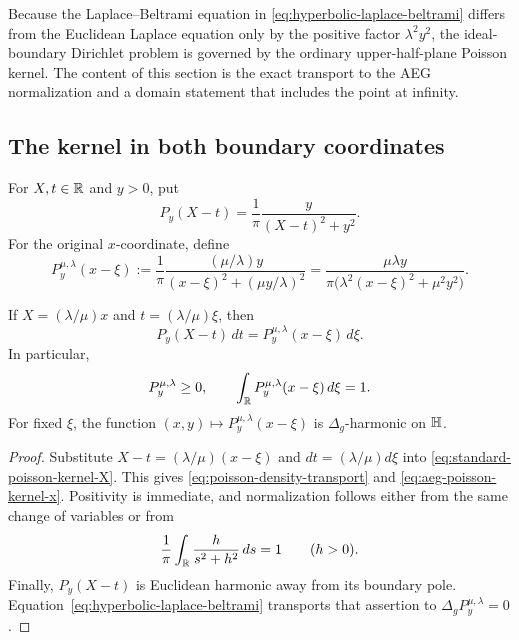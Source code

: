 Because the Laplace--Beltrami equation in
\eqref{eq:hyperbolic-laplace-beltrami} differs from the Euclidean Laplace
equation only by the positive factor $\lambda^2y^2$, the ideal-boundary
Dirichlet problem is governed by the ordinary upper-half-plane Poisson kernel.
The content of this section is the exact transport to the AEG normalization
and a domain statement that includes the point at infinity.

\subsection{The kernel in both boundary coordinates}

For $X,t\in\mathbb{R}$ and $y>0$, put
\begin{equation}\label{eq:standard-poisson-kernel-X}
 P_y(X-t)=\frac1\pi\frac{y}{(X-t)^2+y^2}.
\end{equation}
For the original $x$-coordinate, define
\begin{equation}\label{eq:aeg-poisson-kernel-x}
 P^{\mu,\lambda}_y(x-\xi)
 :=\frac1\pi
   \frac{(\mu/\lambda)y}
        {(x-\xi)^2+(\mu y/\lambda)^2}
 =\frac{\mu\lambda y}
        {\pi\bigl(\lambda^2(x-\xi)^2+\mu^2y^2\bigr)}.
\end{equation}

\begin{lemma}
\label{lem:poisson-kernel-transport}
If $X=(\lambda/\mu)x$ and $t=(\lambda/\mu)\xi$, then
\begin{equation}\label{eq:poisson-density-transport}
 P_y(X-t)\,dt
 =P^{\mu,\lambda}_y(x-\xi)\,d\xi.
\end{equation}
In particular,
\[
 P^{\mu,\lambda}_y\geq0,
 \qquad
 \int_{\mathbb{R}}P^{\mu,\lambda}_y(x-\xi)\,d\xi=1.
\]
For fixed $\xi$, the function $(x,y)\mapsto
P^{\mu,\lambda}_y(x-\xi)$ is $\Delta_g$-harmonic on $\mathbb{H}$.
\end{lemma}

\begin{proof}
Substitute
$X-t=(\lambda/\mu)(x-\xi)$ and
$dt=(\lambda/\mu)d\xi$ into
\eqref{eq:standard-poisson-kernel-X}.  This gives
\eqref{eq:poisson-density-transport} and
\eqref{eq:aeg-poisson-kernel-x}.  Positivity is immediate, and normalization
follows either from the same change of variables or from
\[
 \frac1\pi\int_{\mathbb{R}}\frac{h}{s^2+h^2}\,ds=1
 \qquad(h>0).
\]
Finally, $P_y(X-t)$ is Euclidean harmonic away from its boundary pole.
Equation~\eqref{eq:hyperbolic-laplace-beltrami} transports that assertion to
$\Delta_gP^{\mu,\lambda}_y=0$.
\end{proof}

